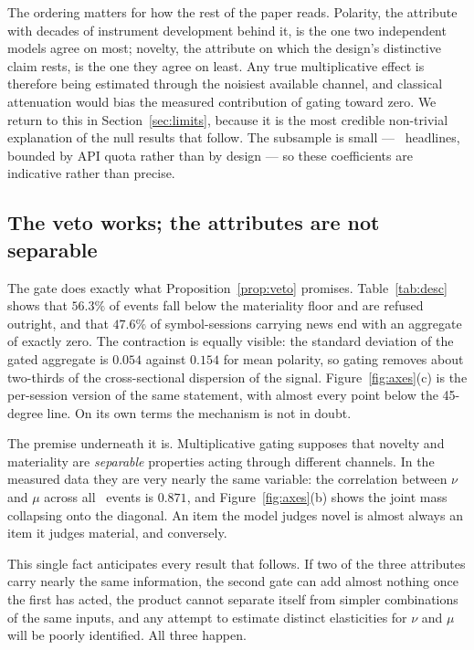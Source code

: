 \documentclass[preprint,12pt,authoryear]{elsarticle}
\theoremstyle{plain}
\theoremstyle{remark}
\begin{document}
The ordering matters for how the rest of the paper reads. Polarity, the
attribute with decades of instrument development behind it, is the one two
independent models agree on most; novelty, the attribute on which the design's
distinctive claim rests, is the one they agree on least. Any true multiplicative
effect is therefore being estimated through the noisiest available channel, and
classical attenuation would bias the measured contribution of gating toward
zero. We return to this in Section~\ref{sec:limits}, because it is the most
credible non-trivial explanation of the null results that follow. The subsample
is small --- \RetestN\ headlines, bounded by API quota rather than by design ---
so these coefficients are indicative rather than precise.

\subsection{The veto works; the attributes are not separable}\label{sec:descriptive}

The gate does exactly what Proposition~\ref{prop:veto} promises.
Table~\ref{tab:desc} shows that $56.3\%$ of events fall below the materiality
floor and are refused outright, and that $47.6\%$ of symbol-sessions carrying
news end with an aggregate of exactly zero. The contraction is equally visible:
the standard deviation of the gated aggregate is $0.054$ against $0.154$ for
mean polarity, so gating removes about two-thirds of the cross-sectional
dispersion of the signal. Figure~\ref{fig:axes}(c) is the per-session version of
the same statement, with almost every point below the 45-degree line. On its own
terms the mechanism is not in doubt.

The premise underneath it is. Multiplicative gating supposes that novelty and
materiality are \emph{separable} properties acting through different channels. In
the measured data they are very nearly the same variable: the correlation between
$\nu$ and $\mu$ across all \ScoredHeadlines\ events is $\mathbf{0.871}$, and
Figure~\ref{fig:axes}(b) shows the joint mass collapsing onto the diagonal. An
item the model judges novel is almost always an item it judges material, and
conversely.

This single fact anticipates every result that follows. If two of the three
attributes carry nearly the same information, the second gate can add almost
nothing once the first has acted, the product cannot separate itself from simpler
combinations of the same inputs, and any attempt to estimate distinct
elasticities for $\nu$ and $\mu$ will be poorly identified. All three happen.
\end{document}
